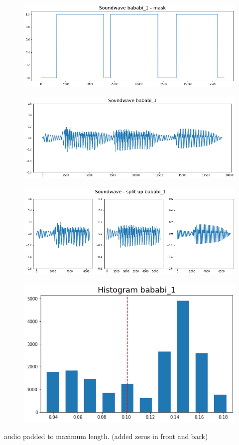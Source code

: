 \begin{figure}
	\centering
	\includegraphics[width=0.7\linewidth]{screenshot014}
	\caption{}
	\label{fig:mask}
\end{figure}

\begin{figure}
	\centering
	\includegraphics[width=0.7\linewidth]{screenshot017}
	\caption{}
	\label{fig:full sound wave adjusted yaxis}
\end{figure}


\begin{figure}
	\centering
	\includegraphics[width=0.7\linewidth]{screenshot016}
	\caption{}
	\label{fig:split up sound wave}
\end{figure}


\begin{figure}
	\centering
	\includegraphics[width=0.4\linewidth]{screenshot018}
	\caption{}
	\label{fig:histogram}
\end{figure}


audio padded to maximum length. (added zeros in front and back)




